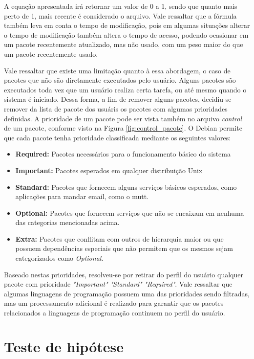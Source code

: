 A equação apresentada irá retornar um valor de 0 a 1, sendo que quanto mais
perto de 1, mais recente é considerado o arquivo. Vale ressaltar que a fórmula
também leva em conta o tempo de modificação, pois em algumas situações alterar o
tempo de modificação também altera o tempo de acesso, podendo ocasionar em um
pacote recentemente atualizado, mas não usado, com um peso maior do que um
pacote recentemente usado.

Vale ressaltar que existe uma limitação quanto à essa abordagem, o caso de
pacotes que não são diretamente executados pelo usuário. Alguns pacotes são
executados toda vez que um usuário realiza certa tarefa, ou até mesmo quando o
sistema é iniciado. Dessa forma, a fim de remover alguns pacotes, decidiu-se
remover da lista de pacote dos usuáris os pacotes com algumas prioridades definidas.
A prioridade de um pacote pode ser vista também no arquivo \textit{control} de um pacote, conforme visto
na Figura \ref{fig:control_pacote}. O Debian permite que cada pacote tenha
prioridade classificada mediante os seguintes valores:

\begin{itemize}
    \item \textbf{Required:} Pacotes necessários para o funcionamento básico do
        sistema
    \item \textbf{Important:} Pacotes esperados em qualquer distribuição Unix
    \item \textbf{Standard:} Pacotes que fornecem alguns serviços básicos
        esperados, como aplicações para mandar email, como o mutt.
    \item \textbf{Optional:} Pacotes que fornecem serviços que não se encaixam
        em nenhuma das categorias mencionadas acima.
    \item \textbf{Extra:} Pacotes que conflitam com outros de hierarquia maior
        ou que possuem dependências especiais que não permitem que os mesmos
        sejam categorizados como \textit{Optional}.
\end{itemize}

Baseado nestas prioridades, resolveu-se por retirar do perfil do usuário
qualquer pacote com prioridade \textit{"Important"} \textit{"Standard"}
\textit{"Required"}. Vale ressaltar que algumas linguagens de programação
possuem uma das prioridades sendo filtradas, mas um processamento adicional é
realizado para garantir que os pacotes relacionados a linguagens de programação
continuem no perfil do usuário.

\section{Teste de hipótese}


